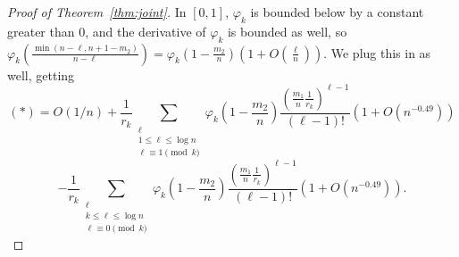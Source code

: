 \documentclass{amsart}
\theoremstyle{definition}
\begin{document}
\begin{proof}[Proof of Theorem~\ref{thm:joint}]
In $[0,1]$, $\varphi_k$ is bounded below by a constant greater than $0$, and the derivative of $\varphi_k$ is bounded as well, so $\varphi_k\left(\frac{\min(n-\ell,n+1-m_2)}{n-\ell}\right)=\varphi_k\left(1-\frac{m_2}{n}\right)\left(1+O\left(\frac{\ell}{n}\right)\right)$. We plug this in as well, getting
\[(*)=O(1/n)+\frac{1}{r_k}\sum_{\substack{\ell\\1\leq \ell \leq \log n\\ \ell\equiv 1 \pmod{k}}}\varphi_k\left(1-\frac{m_2}{n}\right)\frac{\left(\frac{m_1}{n}\frac{1}{r_k}\right)^{\ell-1}}{(\ell-1)!}\left(1+O\left(n^{-0.49}\right)\right)\]\[ - \frac{1}{r_k}\sum_{\substack{\ell\\k\leq \ell \leq \log n\\ \ell\equiv 0 \pmod{k}}}  \varphi_k\left(1-\frac{m_2}{n}\right)\frac{\left(\frac{m_1}{n}\frac{1}{r_k}\right)^{\ell-1}}{(\ell-1)!}\left(1+O\left(n^{-0.49}\right)\right).\]


\end{proof}
\end{document}
